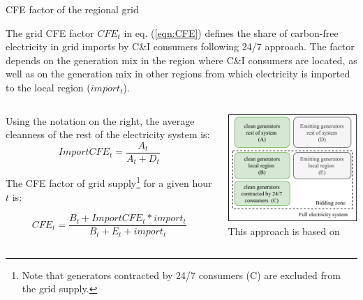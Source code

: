 \begin{frame}{CFE factor of the regional grid}

  {\small

  The \alert{grid CFE factor} $CFE_t$ in eq. (\ref{eqn:CFE}) defines the share of 
  carbon-free electricity  in grid imports by C\&I consumers following 24/7 approach. 
  The factor depends on the generation mix in the region where C\&I consumers are located, 
  as well as on the generation mix in other regions from which electricity is imported
  to the local region ($import_t$). 

  \begin{columns}
    \begin{column}{8cm}

  Using the notation on the right, the average cleanness 
  of the rest of the electricity system is:
  \begin{equation*}
  ImportCFE_t = \frac{A_t}{A_t + D_t}
  \end{equation*}

  The CFE factor of grid supply\footnote{Note 
  that generators contracted by 24/7 consumers (C) are excluded from the grid supply.} 
  for a given hour $t$ is:
  
  \begin{equation*}
  CFE_t = \frac{B_t + ImportCFE_t * import_t}{B_t + E_t + import_t}
  \end{equation*}    

  \end{column}

  \begin{column}{5cm}
  \centering
  \includegraphics[width=5cm]{images/cfe.png}
  {\scriptsize
  This approach is based on 
  }
  \end{column}
    
  \end{columns}

  \noindent{}
  }

\end{frame}


